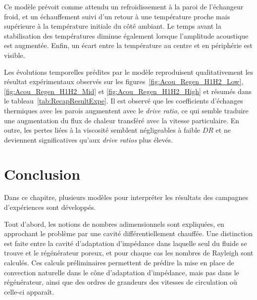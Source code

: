 

Ce modèle prévoit comme attendu un refroidissement à la paroi de l'échangeur froid, et un échauffement suivi d'un retour à une température proche mais supérieure à la température initiale du côté ambiant. Le temps avant la stabilisation des températures diminue également lorsque l'amplitude acoustique est augmentée. Enfin, un écart entre la température au centre et en périphérie est visible.\medskip

Les évolutions temporelles prédites par le modèle reproduisent qualitativement les résultat expérimentaux observés sur les figures~\ref{fig:Acou_Regen_H1H2_Low}, \ref{fig:Acou_Regen_H1H2_Mid} et \ref{fig:Acou_Regen_H1H2_High} et résumés dans le tableau~\ref{tab:RecapResultExpe}. Il est observé que les coefficients d'échanges thermiques avec les parois augmentent avec le \textit{drive ratio}, ce qui semble traduire une augmentation du flux de chaleur transféré avec la vitesse particulaire. En outre, les pertes liées à la viscosité semblent négligeables à faible $DR$ et ne deviennent significatives qu'aux \textit{drive ratios} plus élevés.


\section{Conclusion}
Dans ce chapitre, plusieurs modèles pour interpréter les résultats des campagnes d'expériences sont développés.\medskip

Tout d'abord, les notions de nombres adimensionnels sont expliquées, en approchant le problème par une cavité différentiellement chauffée. Une distinction est faite entre la cavité d'adaptation d'impédance dans laquelle seul du fluide se trouve et le régénérateur poreux, et pour chaque cas les nombres de Rayleigh sont calculés. Ces calculs préliminaires permettent de prédire la mise en place de convection naturelle dans le cône d'adaptation d'impédance, mais pas dans le régénérateur, ainsi que des ordres de grandeurs des vitesses de circulation où celle-ci apparaît.\smallskip

